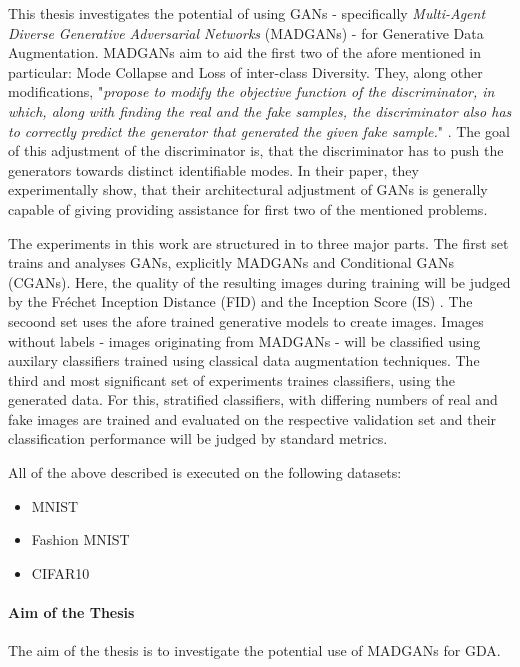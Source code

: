 This thesis investigates the potential of using GANs - specifically \textit{Multi-Agent Diverse Generative Adversarial Networks} (MADGANs) \cite{ghosh2018multiagentdiversegenerativeadversarial} - for Generative Data Augmentation. MADGANs aim to aid the first two of the afore mentioned in particular: Mode Collapse and Loss of inter-class Diversity. They, along other modifications, "\textit{propose to modify the objective function of the discriminator, in which, along with finding the real and the fake samples, the discriminator also has to correctly predict the generator that generated the given fake sample.}" \cite{ghosh2018multiagentdiversegenerativeadversarial}. The goal of this adjustment of the discriminator is, that the discriminator has to push the generators towards distinct identifiable modes. In their paper, they experimentally show, that their architectural adjustment of GANs is generally capable of giving providing assistance for first two of the mentioned problems.

The experiments in this work are structured in to three major parts.
The first set trains and analyses GANs, explicitly MADGANs and Conditional GANs (CGANs). Here, the quality of the resulting images during training will be judged by the Fréchet Inception Distance (FID) \cite{heusel2018ganstrainedtimescaleupdate} and the Inception Score (IS) \cite{salimans2016improvedtechniquestraininggans}.
The secoond set uses the afore trained generative models to create images. Images without labels - images originating from MADGANs - will be classified using auxilary classifiers trained using classical data augmentation techniques.
The third and most significant set of experiments traines classifiers, using the generated data. For this, stratified classifiers, with differing numbers of real and fake images are trained and evaluated on the respective validation set and their classification performance will be judged by standard metrics.


All of the above described is executed on the following datasets:
\begin{itemize}\label{used_datasets}
    \setlength{\itemsep}{-5pt}
    \item MNIST \cite{lecun2010mnist}
    \item Fashion MNIST \cite{xiao2017fashionmnist}
    \item CIFAR10 \cite{Krizhevsky2009learning}
\end{itemize}


\paragraph{Aim of the Thesis}\label{aim_of_the_thesis}
The aim of the thesis is to investigate the potential use of MADGANs for GDA.


\newpage
